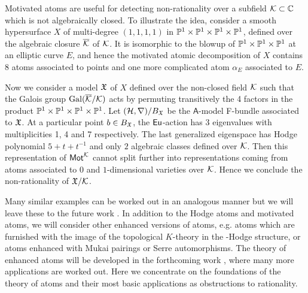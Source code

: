 \documentclass[twoside,leqno]{article}
\numberwithin{equation}{section}
\theoremstyle{plain}
\theoremstyle{definition}
\begin{document}
Motivated atoms are useful for detecting non-rationality over a subfield $\mathcal K\subset \mathbb C$ which is not algebraically closed.
To illustrate the idea, consider a smooth hypersurface $X$ of multi-degree $(1, 1, 1, 1)$ in 
$\mathbb P^1 \times \mathbb P^1 \times \mathbb P^1 \times \mathbb P^1$, defined over the algebraic closure $\overline{\mathcal K}$ of $\mathcal K$. It is isomorphic to the blowup of $\mathbb P^1 \times \mathbb P^1 \times \mathbb P^1$ at an elliptic curve $E$, and hence the motivated atomic decomposition of $X$ contains 8 atoms associated to points and one more complicated atom $\alpha_E$ associated to $E$.

Now we consider a model $\mathfrak X$ of $X$ defined over the non-closed field $\mathcal K$ such that the Galois group $\operatorname{Gal}(\overline{\mathcal K}/\mathcal K)$ acts by permuting transitively the 4 factors in the product $\mathbb P^1 \times \mathbb P^1 \times \mathbb P^1 \times \mathbb P^1$.
Let $(\mathcal H,\nabla)/B_{\mathfrak X}$ be the $\mathsf{A}$-model F-bundle associated to $\mathfrak X$. At a particular point $b\in B_{\mathfrak X}$, the $\operatorname{\mathsf{Eu}}$-action has 3 eigenvalues with multiplicities 1, 4 and 7 respectively.
The last generalized eigenspace has Hodge polynomial $5 + t + t^{-1}$ and only $2$ algebraic classes defined over $\mathcal K$.
Then this representation of $\mathsf{Mot}^{\mathcal K}$ cannot split further into representations coming from atoms associated to $0$ and $1$-dimensional varieties over $\mathcal K$.
Hence we conclude the non-rationality of $\mathfrak X/\mathcal K$.

Many similar examples can be worked out in an analogous manner but we will leave these to the future work \cite{CGKK}.
In addition to the Hodge atoms and motivated atoms, we will consider other enhanced 
versions of atoms, e.g. atoms which are furnished with the image of the topological $K$-theory in the \nc-Hodge structure, or atoms enhanced with Mukai pairings or Serre automorphisms.
The theory of enhanced atoms will be developed in the forthcoming work \cite{KKPY-Gamma}, where many more applications are worked out.
Here we concentrate on the foundations of the theory of atoms and their most basic applications as obstructions to rationality.

\medskip
\end{document}
